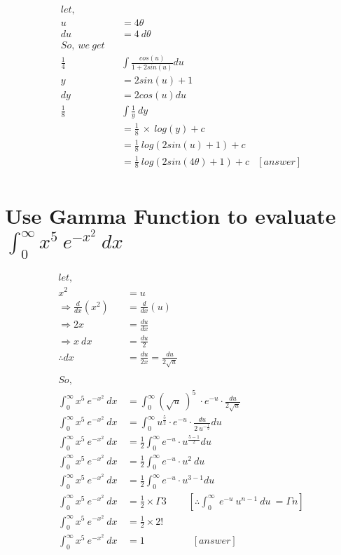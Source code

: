 \documentclass[12pt]{article}%
\begin{document}
\begin{align*}
    let, \ \ \ \ \ &\\
    u &= 4 \theta \\
    du &= 4\: d\theta\\
    So, \ we \ get \ \ \ \ &\\
    \frac{1}{4} &\int \frac{cos(u)}{1+2sin(u)}du\\
    y &= 2sin(u)+1\\
    dy &= 2cos(u)du\\
    \frac{1}{8} &\int \frac{1}{y} \ dy \\
    &= \frac{1}{8} \: \times \ log(y) +c \\
    &= \frac{1}{8} \: log(2sin(u)+1)+c \\
    &= \frac{1}{8} \: log (2sin(4\theta)+1)+c & [answer]\\
\end{align*}


\section{Use Gamma Function to evaluate \ $\int_{0}^{\infty} x^{5} \ e ^{-x^2} \ dx$}

\begin{align*}
    let, \ \ \ \ \ \ \ &\\
    x^2 &= u \\
    \Rightarrow \frac{d}{dx} (x^2) &= \frac{d}{dx}(u)\\
    \Rightarrow 2x &= \frac{du}{dx} \\
    \Rightarrow x\:dx &= \frac{du}{2}\\
    \therefore dx &= \frac{du}{2x} = \frac{du}{2\sqrt{u}}\\\\
    So,  \ \ \ \ \ \ \ \ \ \ \ \ \ \ \ \ \ \ \ \ \   &\\
    \int_{0}^{\infty} x^{5} \ e ^{-x^2} \ dx &=  \int_{0}^{\infty} (\sqrt{u} \: )^5 \:\cdot e^{-u} \cdot \frac{du}{2\sqrt{u}}\\
    \int_{0}^{\infty} x^{5} \ e ^{-x^2} \ dx &= \int_{0}^{\infty} u^{\frac{5}{2}} \cdot e^{-u} \cdot \frac{du}{2\:u^{-\frac{1}{2}}} du\\
    \int_{0}^{\infty} x^{5} \ e ^{-x^2} \ dx &=  \frac{1}{2} \int_{0}^{\infty} e^{-u} \cdot u^{\frac{5-1}{2}}du\\
    \int_{0}^{\infty} x^{5} \ e ^{-x^2} \ dx &=  \frac{1}{2} \int_{0}^{\infty} e^{-u} \cdot u^{2}\:du\\
    \int_{0}^{\infty} x^{5} \ e ^{-x^2} \ dx &=  \frac{1}{2} \int_{0}^{\infty} e^{-u} \cdot u^{3-1}du\\
    \int_{0}^{\infty} x^{5} \ e ^{-x^2} \ dx &= \frac{1}{2} \times \Gamma{3}\ \ \ \ \ \ \ \ \ \ \left[ \therefore \int_{0}^{\infty} \: e^{-u} \: u^{n-1} \: du \: = \Gamma{n}\right] \\
    \int_{0}^{\infty} x^{5} \ e ^{-x^2} \ dx &= \frac{1}{2} \times 2! \\
    \int_{0}^{\infty} x^{5} \ e ^{-x^2} \ dx &= 1 \ \ \ \ \ \ \ \ \ \ \ \ \ \ \ \ \ \ \ \ \ \ \left[answer \right]\\
\end{align*}
\end{document}
